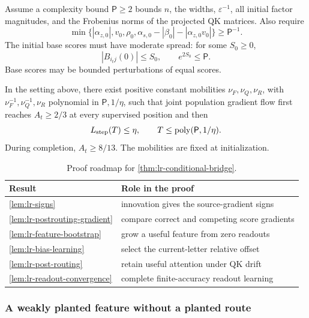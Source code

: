 Assume a complexity bound $\mathsf P\ge2$ bounds $n$, the widths,
$\varepsilon^{-1}$, all initial factor magnitudes, and the Frobenius norms
of the projected QK matrices. Also require
\[
 \min\{|\alpha_{z,0}|,v_0,\rho_0,\alpha_{s,0}-|\beta_0|-|\alpha_{z,0}v_0|\}\ge \mathsf P^{-1}.
\]
The initial base scores must have moderate spread: for some $S_0\ge0$,
\[
 |B_{i_tj}(0)|\le S_0,\qquad e^{2S_0}\le \mathsf P.
\]
Base scores may be bounded perturbations of equal scores.

\begin{lrtheorem}
\label{thm:lr-conditional-bridge}
In the setting above, there exist positive constant mobilities
$\nu_F,\nu_Q,\nu_R$, with $\nu_F^{-1},\nu_Q^{-1},\nu_R$
polynomial in $\mathsf P,1/\eta$, such that joint population gradient flow first
reaches $A_t\ge2/3$ at every supervised position and then
\begin{equation}\label{eq:lr-finite-theorem}
 L_{\mathrm{step}}(T)\le\eta,\qquad T\le\operatorname{poly}(\mathsf P,1/\eta).
\end{equation}
During completion, $A_t\ge8/13$. The mobilities are fixed at initialization.
\end{lrtheorem}

\begin{table}[htbp]
\centering\small
\begin{tabular}{@{}ll@{}}
\toprule
Result & Role in the proof\\
\midrule
\ref{lem:lr-signs} & innovation gives the source-gradient signs\\
\ref{lem:lr-postrouting-gradient} & compare correct and competing score gradients\\
\ref{lem:lr-feature-bootstrap} & grow a useful feature from zero readouts\\
\ref{lem:lr-bias-learning} & select the current-letter relative offset\\
\ref{lem:lr-post-routing} & retain useful attention under QK drift\\
\ref{lem:lr-readout-convergence} & complete finite-accuracy readout learning\\
\bottomrule
\end{tabular}
\caption{Proof roadmap for \cref{thm:lr-conditional-bridge}.}
\label{tab:lr-roadmap}
\end{table}

\subsubsection{A weakly planted feature without a planted route}
\label{app:weak-routing-family}

